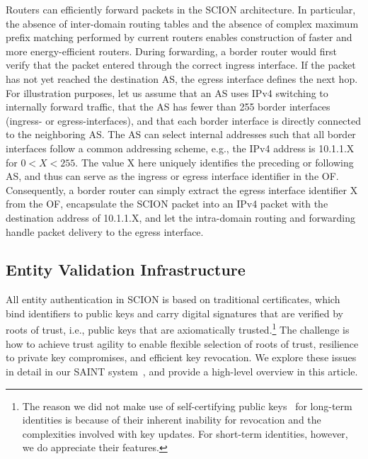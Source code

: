 \documentclass[a4paper]{llncs}
\newcommand\SCION{{\small\textsf{SCION}}\xspace}
\begin{document}
Routers can efficiently forward packets in the \SCION architecture. In
particular, the absence of inter-domain routing tables and the absence of
complex maximum prefix matching performed by current routers enables
construction of faster and more energy-efficient routers. During forwarding, a
border router would first verify that the packet entered through the correct
ingress interface. If the packet has not yet reached the destination AS, the
egress interface defines the next hop. For illustration purposes, let us assume
that an AS uses IPv4 switching to internally forward traffic, that the AS has
fewer than 255 border interfaces (ingress- or egress-interfaces), and that each
border interface is directly connected to the neighboring AS. The AS can select
internal addresses such that all border interfaces follow a common addressing
scheme, e.g., the IPv4 address is 10.1.1.X for $0<X<255$. The value X here
uniquely identifies the preceding or following AS, and thus can serve as the
ingress or egress interface identifier in the OF. Consequently, a border router
can simply extract the egress interface identifier X from the OF, encapsulate
the \SCION packet into an IPv4 packet with the destination address of 10.1.1.X,
and let the intra-domain routing and forwarding handle packet delivery to the
egress interface. 



\subsection{Entity Validation Infrastructure}

All entity authentication in \SCION is based on traditional certificates, which
bind identifiers to public keys and carry digital signatures that are
verified by roots of trust, i.e., public keys that are axiomatically
trusted.\footnote{The reason we did not make use of self-certifying public
  keys~\cite{HIP,AIP} for long-term identities is because of their
  inherent inability for revocation and the complexities involved with key
  updates. For short-term identities, however, we do appreciate their features.}
The challenge is how to achieve trust agility to enable flexible selection of
roots of trust, resilience to private key compromises, and efficient key
revocation. We explore these issues in detail in our SAINT system~\cite{MRSKP2015},
and provide a high-level overview in this article.
\end{document}
